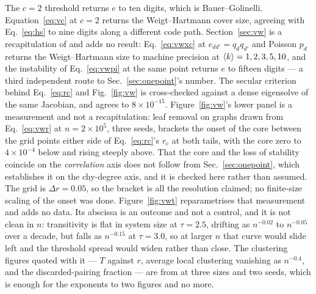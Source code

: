 The $c=2$ threshold returns $e$ to ten digits, which is Bauer--Golinelli.
Equation~\eqref{eq:vc} at $c=2$ returns the Weigt--Hartmann cover size, agreeing
with Eq.~\eqref{eq:hs} to nine digits along a different code path.
Section~\ref{sec:vw} is a recapitulation of \citet{vazquez2003vw} and adds no
result: Eq.~\eqref{eq:vwxc} at $e_{dd'}=q_{d}q_{d'}$ and Poisson $p_{d}$
returns the Weigt--Hartmann size to machine precision at $\langle k \rangle=1,2,3,5,10$,
and the instability of Eq.~\eqref{eq:vwpi} at the same point returns $e$ to
fifteen digits --- a third independent route to Sec.~\ref{sec:onepoint}'s
number. The secular criterion behind Eq.~\eqref{eq:rc} and
Fig.~\ref{fig:vw} is cross-checked against a dense eigensolve of the same
Jacobian, and agrees to $8\times10^{-15}$. Figure~\ref{fig:vw}'s lower panel is
a measurement and not a recapitulation: leaf removal on graphs drawn from
Eq.~\eqref{eq:vwr} at $n=2\times10^{5}$, three seeds, brackets the onset of the
core between the grid points either side of Eq.~\eqref{eq:rc}'s
$r_{\mathrm{c}}$ at both tails, with the core zero to $4\times10^{-4}$ below
and rising steeply above. That the core and the loss of stability coincide on
the \emph{correlation} axis does not follow from Sec.~\ref{sec:onepoint}, which
establishes it on the chy-degree axis, and it is checked here rather than
assumed. The grid is $\Delta r=0.05$, so the bracket is all the resolution
claimed; no finite-size scaling of the onset was done. Figure~\ref{fig:vwt}
reparametrises that measurement and adds no data. Its abscissa is an outcome
and not a control, and it is not clean in $n$: transitivity is flat in system
size at $\tau=2.5$, drifting as $n^{-0.02}$ to $n^{-0.05}$ over a decade, but
falls as $n^{-0.15}$ at $\tau=3.0$, so at larger $n$ that curve would slide
left and the threshold spread would widen rather than close. The clustering
figures quoted with it --- $T$ against $r$, average local clustering vanishing
as $n^{-0.4}$, and the discarded-pairing fraction --- are from
at three sizes and two seeds, which is enough for the exponents to two figures
and no more.

